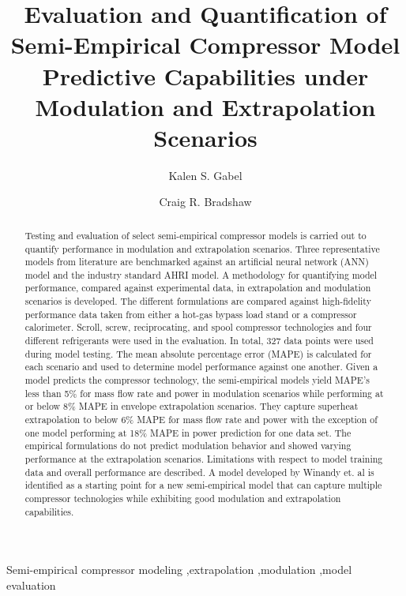\documentclass[preprint,11pt,authoryear]{elsarticle}
\begin{document}

\begin{frontmatter}

\title{Evaluation and Quantification of Semi-Empirical Compressor Model Predictive Capabilities under Modulation and Extrapolation Scenarios}

\author[1]{Kalen S. Gabel
}
\author[1]{Craig R. Bradshaw}
\address[1]{Center for Integrated Building Systems, Oklahoma State University, Stillwater, OK 74078}
\begin{abstract}

Testing and evaluation of select semi-empirical compressor models is carried out to quantify performance in modulation and extrapolation scenarios. Three representative models from literature are benchmarked against an artificial neural network (ANN) model and the industry standard AHRI model. A methodology for quantifying model performance, compared against experimental data, in extrapolation and modulation scenarios is developed. The different formulations are compared against high-fidelity performance data taken from either a hot-gas bypass load stand or a compressor calorimeter. Scroll, screw, reciprocating, and spool compressor technologies and four different refrigerants were used in the evaluation. In total, 327 data points were used during model testing. The mean absolute percentage error (MAPE) is calculated for each scenario and used to determine model performance against one another. Given a model predicts the compressor technology, the semi-empirical models yield MAPE’s less than 5\% for mass flow rate and power in modulation scenarios while performing at or below 8\% MAPE in envelope extrapolation scenarios. They capture superheat extrapolation to below 6\% MAPE for mass flow rate and power with the exception of one model performing at 18\% MAPE in power prediction for one data set. The empirical formulations do not predict modulation behavior and showed varying performance at the extrapolation scenarios. Limitations with respect to model training data and overall performance are described. A model developed by Winandy et. al is identified as a starting point for a new semi-empirical model that can capture multiple compressor technologies while exhibiting good modulation and extrapolation capabilities.
\end{abstract}

\begin{keyword}
Semi-empirical compressor modeling \sep extrapolation \sep modulation \sep model evaluation
\end{keyword}

\end{frontmatter}
\end{document}
